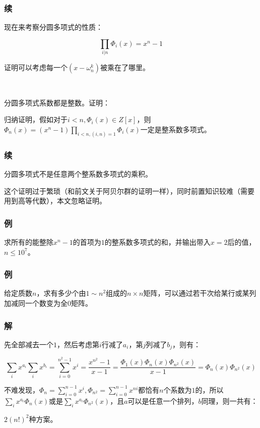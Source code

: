 \documentclass[10pt]{beamer}
\begin{document}
	\begin{frame}
		\frametitle{续}
	
		现在来考察分圆多项式的性质：
		
		$$
		\prod_{i|n}\Phi_i(x)=x^n-1
		$$

		证明可以考虑每一个$(x-\omega_n^k)$被乘在了哪里。

		$ $

		分圆多项式系数都是整数。证明：
		
		归纳证明，假如对于$i<n,\Phi_i(x)\in Z[x]$，则$\Phi_n(x)=(x^n-1)\prod_{i<n,(i,n)=1}\Phi_i(x)$一定是整系数多项式。
	
	\end{frame}
	\begin{frame}
		\frametitle{续}
	
		分圆多项式不是任意两个整系数多项式的乘积。

		这个证明过于繁琐（和前文关于阿贝尔群的证明一样），同时前置知识较难（需要用到高等代数），本文忽略证明。

	\end{frame}
	\begin{frame}
		\frametitle{例}
	
		求所有的能整除$x^n-1$的首项为$1$的整系数多项式的和，并输出带入$x=2$后的值，$n\le 10^7$。
	
	\end{frame}
	\begin{frame}
		\frametitle{例}
	
		给定质数$n$，求有多少个由$1\sim n^2$组成的$n\times n$矩阵，可以通过若干次给某行或某列加减同一个数变为全$0$矩阵。
	
	\end{frame}
	\begin{frame}
		\frametitle{解}
	
		先全部减去一个$1$，然后考虑第$i$行减了$a_i$，第$j$列减了$b_j$，则有：

		$$
		\sum_{i}x^{a_i}\sum_{i}x^{b_i}=\sum_{i=0}^{n^2-1} x^i=\dfrac{x^{n^2}-1}{x-1}=\dfrac{\Phi_1(x)\Phi_n(x)\Phi_{n^2}(x)}{x-1}=\Phi_n(x)\Phi_{n^2}(x)
		$$

		不难发现，$\Phi_{n}=\sum_{i=0}^{n-1}x^{i},\Phi_{n^2}=\sum_{i=0}^{n-1}x^{ni}$都恰有$n$个系数为$1$的，所以$\sum_i x^{a_i}\Phi_n(x)$或是$\sum_i x^{a_i}\Phi_{n^2}(x)$，且$a$可以是任意一个排列，$b$同理，则一共有：

		$2(n!)^2$种方案。
	
	\end{frame}
\end{document}
